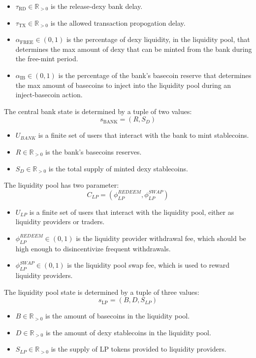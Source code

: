\documentclass{ifcolog}
\newcommand{\ubank}{U_{BANK}}
\newcommand{\ulp}{U_{LP}}
\begin{document}
\begin{itemize}
  \item $\tau_{\textrm{RD}} \in \mathbb{R}_{>0}$ is the release-dexy bank delay.
  \item $\tau_{\textrm{TX}} \in \mathbb{R}_{>0}$ is the allowed transaction propogation delay.
  \item $\alpha_{\textrm{FREE}} \in (0,1)$ is the percentage of dexy liquidity, in the liquidity pool, that determines the max amount of dexy that can be minted from the bank during the free-mint period.
  \item $\alpha_{\textrm{IB}} \in (0,1)$ is the percentage of the bank's basecoin reserve that determines the max amount of basecoins to inject into the liquidity pool during an inject-basecoin action.
\end{itemize}

The central bank state is determined by a tuple of two values:
$$s_{\textrm{BANK}} = \left(R, S_{D} \right)$$

\begin{itemize}
  \item $\ubank$ is a finite set of users that interact with the bank to mint stablecoins.
  \item $R \in \mathbb{R}_{>0}$ is the bank's basecoins reserves.
  \item $S_D \in \mathbb{R}_{>0}$ is the total supply of minted dexy stablecoins.
\end{itemize}

The liquidity pool has two parameter:
$$C_{LP} = \left(\phi^{REDEEM}_{LP}, \phi^{SWAP}_{LP}\right)$$

\begin{itemize}
  \item $\ulp$ is a finite set of users that interact with the liquidity pool, either as liquidity providers or traders.
  \item $\phi^{REDEEM}_{LP} \in (0,1)$ is the liquidity provider withdrawal fee, which should be high enough to disincentivize frequent withdrawals.
  \item $\phi^{SWAP}_{LP} \in (0, 1)$ is the liquidity pool swap fee, which is used to reward liquidity providers. 
\end{itemize}

The liquidity pool state is determined by a tuple of three values:
$$s_{\textrm{LP}} = \left(B, D, S_{LP} \right)$$

\begin{itemize}
  \item $B \in \mathbb{R}_{>0}$ is the amount of basecoins in the liquidity pool.
  \item $D \in \mathbb{R}_{>0}$ is the amount of dexy stablecoins in the liquidity pool.
  \item $S_{LP} \in \mathbb{R}_{>0}$ is the supply of LP tokens provided to liquidity providers.
\end{itemize}
\end{document}
